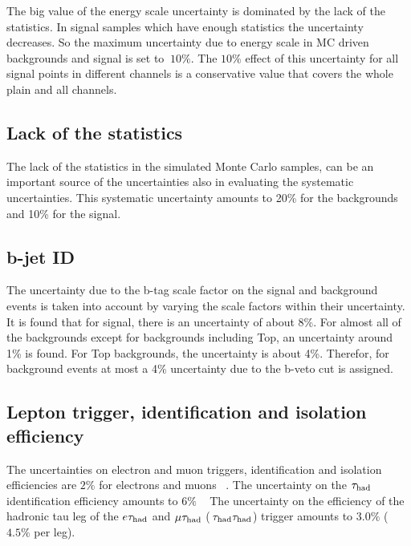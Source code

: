 The big value of the \hadtau energy scale uncertainty is dominated by the lack of the statistics. In signal samples which have enough statistics the uncertainty decreases. So the maximum uncertainty due to \hadtau energy scale in MC driven backgrounds and signal is set to $~10\%$.
The $10\%$ effect of this uncertainty for all signal points in different channels is a conservative value that covers the whole plain and all channels.

\subsection{Lack of the statistics} The lack of the statistics in the simulated Monte Carlo samples, can be an important source of the uncertainties also in evaluating 
the systematic uncertainties. This systematic uncertainty amounts to 20\% for the backgrounds and 10\% for the signal.


\subsection{b-jet ID}
The uncertainty due to the b-tag scale factor on the signal and background events is taken into account by varying the scale factors within their 
uncertainty. It is found that for signal, there is an uncertainty of about $8\%$. For almost all of the backgrounds except for backgrounds including Top, an uncertainty around 1\% is found. For Top backgrounds, the uncertainty is about 4\%. Therefor, for background events at most a 4\% uncertainty due to the b-veto cut is assigned. 
 
\subsection{Lepton trigger, identification and isolation efficiency}
The uncertainties on electron and muon triggers, identification and isolation efficiencies are $2\%$ for electrons and muons ~\cite{CMS_AN_2013-171}. The uncertainty on the $\tau_{\rm had}$ identification efficiency amounts to $6\%$ ~\cite{CMS_AN_2013-171}
The uncertainty on the efficiency of the hadronic tau leg of the $e\tau_{\rm had}$ and $\mu\tau_{\rm had}$ ($\,\tau_{\rm had}\tau_{\rm had}$) trigger amounts to $3.0\%$ ($4.5\%$ per leg).

